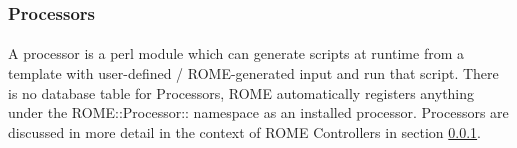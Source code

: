 \subsubsection{Processors}
\label{sec:processors}
\paragraph{}
A processor is a perl module which can generate scripts at runtime from a template with user-defined / ROME-generated input and run that script. There is no database table for Processors, ROME automatically registers anything under the ROME::Processor:: namespace as an installed processor. Processors are discussed in more detail in the context of ROME Controllers in section \ref{sec:processors}.





